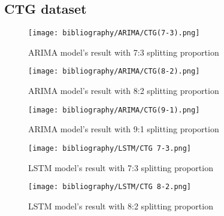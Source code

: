 \documentclass{ieeeojies}
\begin{document}
\subsection{CTG dataset} 


\begin{figure}[H]
  \centering
  \begin{minipage}{0.8\linewidth}
    \centering
    \texttt{[image: bibliography/ARIMA/CTG(7-3).png]}
    \caption{ARIMA model's result with 7:3 splitting proportion}
    \label{fig8}
  \end{minipage}
\end{figure}

\begin{figure}[H]
  \centering
  \begin{minipage}{0.8\linewidth}
    \centering
    \texttt{[image: bibliography/ARIMA/CTG(8-2).png]}
    \caption{ARIMA model's result with 8:2 splitting proportion}
    \label{fig8}
  \end{minipage}
\end{figure}

\begin{figure}[H]
  \centering
  \begin{minipage}{0.8\linewidth}
    \centering
    \texttt{[image: bibliography/ARIMA/CTG(9-1).png]}
    \caption{ARIMA model's result with 9:1 splitting proportion}
    \label{fig8}
  \end{minipage}
\end{figure}


\begin{figure}[H]
  \centering
  \begin{minipage}{0.8\linewidth}
    \centering
    \texttt{[image: bibliography/LSTM/CTG 7-3.png]}
    \caption{LSTM model's result with 7:3 splitting proportion}
    \label{fig8}
  \end{minipage}
\end{figure}

\begin{figure}[H]
  \centering
  \begin{minipage}{0.8\linewidth}
    \centering
    \texttt{[image: bibliography/LSTM/CTG 8-2.png]}
    \caption{LSTM model's result with 8:2 splitting proportion}
    \label{fig8}
  \end{minipage}
\end{figure}
\end{document}
